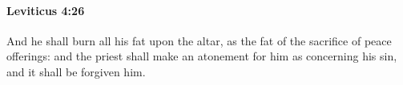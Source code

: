 
		\paragraph{Leviticus 4:26} %
			\label{LEVITICUS-4-26}

			And he shall burn all his fat upon the altar, as the fat of the sacrifice of peace offerings: and the priest shall make an atonement for him as concerning his sin, and it shall be forgiven him.


